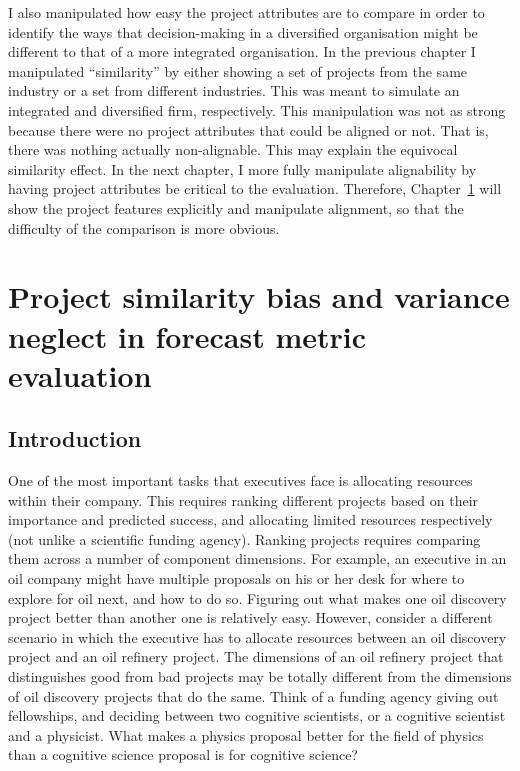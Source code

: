 \documentclass[a4paper, nobind, dvipsnames]{templates/ociamthesis}
\theoremstyle{definition}
\theoremstyle{definition}
\theoremstyle{definition}
\theoremstyle{definition}
\theoremstyle{remark}
\begin{document}
I also manipulated how easy the project attributes are to compare in order to
identify the ways that decision-making in a diversified organisation might be
different to that of a more integrated organisation. In the previous chapter I
manipulated ``similarity'' by either showing a set of projects from the same
industry or a set from different industries. This was meant to simulate an
integrated and diversified firm, respectively. This manipulation was not as
strong because there were no project attributes that could be aligned or not.
That is, there was nothing actually non-alignable. This may explain the
equivocal similarity effect. In the next chapter, I more fully manipulate
alignability by having project attributes be critical to the evaluation.
Therefore, Chapter~\ref{alignment} will show the project features explicitly
and manipulate alignment, so that the difficulty of the comparison is more
obvious.

\hypertarget{alignment}{%
\chapter{Project similarity bias and variance neglect in forecast metric evaluation}\label{alignment}}

\minitoc

\section{Introduction}

One of the most important tasks that executives face is allocating resources
within their company. This requires ranking different projects based on their
importance and predicted success, and allocating limited resources respectively
(not unlike a scientific funding agency). Ranking projects requires comparing
them across a number of component dimensions. For example, an executive in an
oil company might have multiple proposals on his or her desk for where to
explore for oil next, and how to do so. Figuring out what makes one oil
discovery project better than another one is relatively easy. However, consider
a different scenario in which the executive has to allocate resources between an
oil discovery project and an oil refinery project. The dimensions of an oil
refinery project that distinguishes good from bad projects may be totally
different from the dimensions of oil discovery projects that do the same. Think
of a funding agency giving out fellowships, and deciding between two cognitive
scientists, or a cognitive scientist and a physicist. What makes a physics
proposal better for the field of physics than a cognitive science proposal is
for cognitive science?
\end{document}
